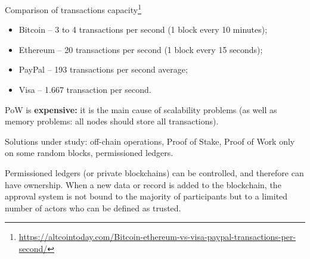 Comparison of transactions capacity\footnote{\url{https://altcointoday.com/Bitcoin-ethereum-vs-visa-paypal-transactions-per-second/}}
\begin{itemize}
	\item Bitcoin – 3 to 4 transactions per second (1 block every 10 minutes);
	\item Ethereum – 20 transactions per second (1 block every 15 seconds);
	\item PayPal – 193 transactions per second average;
	\item Visa – 1.667 transaction per second.
\end{itemize}

PoW is \textbf{expensive:} it is the main cause of scalability problems (as well as memory problems: all nodes should store all transactions).

Solutions under study: off-chain operations, Proof of Stake, Proof of Work only on some random blocks, permissioned ledgers.

Permissioned ledgers (or private blockchains) can be controlled, and therefore can have ownership. When a new data or record is added to the blockchain, the approval system is not bound to the majority of participants but to a limited number of actors who can be defined as trusted.

